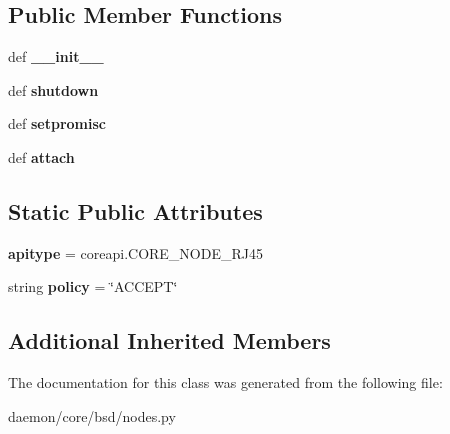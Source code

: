\subsection*{Public Member Functions}
\begin{DoxyCompactItemize}
\item 
\hypertarget{classcore_1_1bsd_1_1nodes_1_1_r_j45_node_abe94f6f225fda975bdd2801b44512e58}{def {\bfseries \+\_\+\+\_\+init\+\_\+\+\_\+}}\label{classcore_1_1bsd_1_1nodes_1_1_r_j45_node_abe94f6f225fda975bdd2801b44512e58}

\item 
\hypertarget{classcore_1_1bsd_1_1nodes_1_1_r_j45_node_a7f24258e322221cfa43f66d1f78b4f19}{def {\bfseries shutdown}}\label{classcore_1_1bsd_1_1nodes_1_1_r_j45_node_a7f24258e322221cfa43f66d1f78b4f19}

\item 
\hypertarget{classcore_1_1bsd_1_1nodes_1_1_r_j45_node_ad9ad26bb143917dedff00013ff8ec565}{def {\bfseries setpromisc}}\label{classcore_1_1bsd_1_1nodes_1_1_r_j45_node_ad9ad26bb143917dedff00013ff8ec565}

\item 
\hypertarget{classcore_1_1bsd_1_1nodes_1_1_r_j45_node_a2824de17e249931f7c639fd10b9ada32}{def {\bfseries attach}}\label{classcore_1_1bsd_1_1nodes_1_1_r_j45_node_a2824de17e249931f7c639fd10b9ada32}

\end{DoxyCompactItemize}
\subsection*{Static Public Attributes}
\begin{DoxyCompactItemize}
\item 
\hypertarget{classcore_1_1bsd_1_1nodes_1_1_r_j45_node_a5dd7e62897112f779cf321712a15e50b}{{\bfseries apitype} = coreapi.\+C\+O\+R\+E\+\_\+\+N\+O\+D\+E\+\_\+\+R\+J45}\label{classcore_1_1bsd_1_1nodes_1_1_r_j45_node_a5dd7e62897112f779cf321712a15e50b}

\item 
\hypertarget{classcore_1_1bsd_1_1nodes_1_1_r_j45_node_ad75f97d005dd40ba3787deb3ae5360c7}{string {\bfseries policy} = \char`\"{}A\+C\+C\+E\+P\+T\char`\"{}}\label{classcore_1_1bsd_1_1nodes_1_1_r_j45_node_ad75f97d005dd40ba3787deb3ae5360c7}

\end{DoxyCompactItemize}
\subsection*{Additional Inherited Members}


The documentation for this class was generated from the following file\+:\begin{DoxyCompactItemize}
\item 
daemon/core/bsd/nodes.\+py\end{DoxyCompactItemize}
